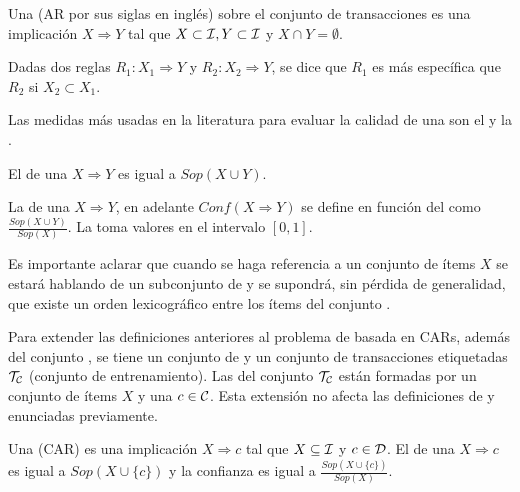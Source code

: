 \begin{Definition}[\AR]
  Una \AR (AR por sus siglas en inglés) sobre el conjunto de transacciones \T es una implicación $X\Rightarrow Y$ tal que $X\subset\I, Y\subset\I$ y $X\cap Y=\emptyset$.
\label{def:reglas-de-asociacion}
\end{Definition}

\begin{Definition}[Especificidad]
  Dadas dos reglas $R_1: X_1\Rightarrow Y$ y $R_2: X_2\Rightarrow Y$, se dice que $R_1$ es más específica que $R_2$ si $X_2\subset X_1$.
\label{def:especificidad}
\end{Definition}

Las medidas más usadas en la literatura para evaluar la calidad de una \AR son el \soporte y la \confianza.

\begin{Definition}
  El \soporte de una \ar $X\Rightarrow Y$ es igual a $Sop(X\cup Y)$.
\label{def:soporte-de-una-AR}
\end{Definition}

\begin{Definition}
  La \confianza de una \ar $X\Rightarrow Y$, en adelante $Conf(X\Rightarrow Y)$ se define en función del \soporte como $\frac{Sop(X\cup Y)}{Sop(X)}$. La \confianza toma valores en el intervalo $[0,1]$.
\label{def:confianza-de-una-AR}
\end{Definition}

Es importante aclarar que cuando se haga referencia a un conjunto de ítems $X$ se estará hablando de un subconjunto de \I y se supondrá, sin pérdida de generalidad, que existe un orden lexicográfico entre los ítems del conjunto \I.

Para extender las definiciones anteriores al problema de \clasificacion basada en CARs, además del conjunto \I, se tiene un conjunto de \clases \C y un conjunto de transacciones etiquetadas $\T_\C$ (conjunto de entrenamiento). Las \transacciones del conjunto $\T_\C$ están formadas por un conjunto de ítems $X$ y una \clase $c\in \C$. Esta extensión no afecta las definiciones de \soporte y \confianza enunciadas previamente.

\begin{Definition}[\CAR]
  Una \CAR (CAR) es una implicación $X\Rightarrow c$ tal que $X\subseteq\I$ y $c\in\D$. El \soporte de una \CAR $X\Rightarrow c$ es igual a $Sop(X\cup\{c\})$ y la confianza es igual a $\frac{Sop(X\cup\{c\})}{Sop(X)}$.
\label{def:CAR}
\end{Definition}

